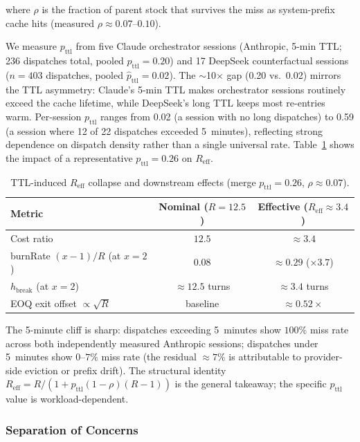 \documentclass[11pt]{article}
\theoremstyle{definition}
\theoremstyle{remark}
\begin{document}
where $\rho$ is the fraction of parent stock that survives the miss as system-prefix cache hits (measured $\rho \approx 0.07$--$0.10$).

We measure $p_{\text{ttl}}$ from five Claude orchestrator sessions (Anthropic, 5-min TTL; 236 dispatches total, pooled $p_{\text{ttl}} = 0.20$) and 17 DeepSeek counterfactual sessions ($n = 403$ dispatches, pooled $\hat{p}_{\text{ttl}} = 0.02$). The $\sim$10$\times$ gap (0.20 vs.\ 0.02) mirrors the TTL asymmetry: Claude's 5-min TTL makes orchestrator sessions routinely exceed the cache lifetime, while DeepSeek's long TTL keeps most re-entries warm. Per-session $p_{\text{ttl}}$ ranges from 0.02 (a session with no long dispatches) to 0.59 (a session where 12 of 22 dispatches exceeded 5~minutes), reflecting strong dependence on dispatch density rather than a single universal rate. Table~\ref{tab:ttl} shows the impact of a representative $p_{\text{ttl}} = 0.26$ on $R_{\text{eff}}$.

\begin{table}[ht]
\centering
\caption{TTL-induced $R_{\text{eff}}$ collapse and downstream effects (merge $p_{\text{ttl}} = 0.26$, $\rho \approx 0.07$).}
\label{tab:ttl}
\begin{tabular}{lcc}
\toprule
Metric & Nominal ($R = 12.5$) & Effective ($R_{\text{eff}} \approx 3.4$) \\
\midrule
Cost ratio & $12.5$ & $\approx 3.4$ \\
burnRate $(x-1)/R$ (at $x = 2$) & $0.08$ & $\approx 0.29$ ($\times 3.7$) \\
$h_{\text{break}}$ (at $x = 2$) & $\approx 12.5$ turns & $\approx 3.4$ turns \\
EOQ exit offset $\propto \sqrt{R}$ & baseline & $\approx 0.52\times$ \\
\bottomrule
\end{tabular}
\end{table}

The 5-minute cliff is sharp: dispatches exceeding 5~minutes show $100\%$ miss rate across both independently measured Anthropic sessions; dispatches under 5~minutes show $0$--$7\%$ miss rate (the residual $\approx 7\%$ is attributable to provider-side eviction or prefix drift). The structural identity $R_{\text{eff}} = R / (1 + p_{\text{ttl}}(1-\rho)(R-1))$ is the general takeaway; the specific $p_{\text{ttl}}$ value is workload-dependent.

\subsubsection{Separation of Concerns}
\end{document}
